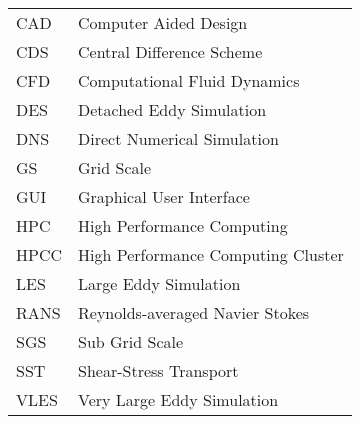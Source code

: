 \begin{table}[h]
\begin{tabular}{ll}
CAD&Computer Aided Design\\
CDS&Central Difference Scheme\\
CFD&Computational Fluid Dynamics\\
DES&Detached Eddy Simulation\\
DNS&Direct Numerical Simulation\\
GS&Grid Scale\\
GUI&Graphical User Interface\\
HPC&High Performance Computing\\
HPCC&High Performance Computing Cluster\\
LES&Large Eddy Simulation\\
RANS&Reynolds-averaged Navier Stokes\\
SGS&Sub Grid Scale\\
SST&Shear-Stress Transport\\
VLES&Very Large Eddy Simulation\\
\end{tabular}
\end{table}